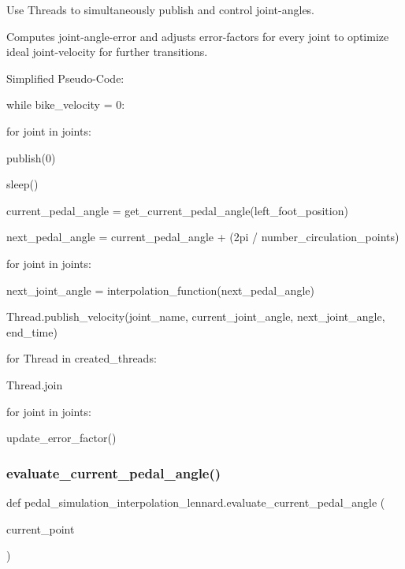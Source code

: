 Use Threads to simultaneously publish and control joint-\/angles.

Computes joint-\/angle-\/error and adjusts error-\/factors for every joint to optimize ideal joint-\/velocity for further transitions.

Simplified Pseudo-\/\+Code\+:

while bike\+\_\+velocity = 0\+: \begin{DoxyVerb}for joint in joints:

    publish(0)

sleep()
\end{DoxyVerb}


current\+\_\+pedal\+\_\+angle = get\+\_\+current\+\_\+pedal\+\_\+angle(left\+\_\+foot\+\_\+position)

next\+\_\+pedal\+\_\+angle = current\+\_\+pedal\+\_\+angle + (2pi / number\+\_\+circulation\+\_\+points)

for joint in joints\+: \begin{DoxyVerb}next_joint_angle = interpolation_function(next_pedal_angle)

Thread.publish_velocity(joint_name, current_joint_angle, next_joint_angle, end_time)
\end{DoxyVerb}


for Thread in created\+\_\+threads\+: \begin{DoxyVerb}Thread.join
\end{DoxyVerb}


for joint in joints\+: \begin{DoxyVerb}update_error_factor()
\end{DoxyVerb}
 \mbox{\label{namespacepedal__simulation__interpolation__lennard_ab435b1b0cf2f13e1e33b8870ac13e415}} 
\subsubsection{\texorpdfstring{evaluate\_current\_pedal\_angle()}{evaluate\_current\_pedal\_angle()}}
{\footnotesize\ttfamily def pedal\+\_\+simulation\+\_\+interpolation\+\_\+lennard.\+evaluate\+\_\+current\+\_\+pedal\+\_\+angle (\begin{DoxyParamCaption}\item[{}]{current\+\_\+point }\end{DoxyParamCaption})}




